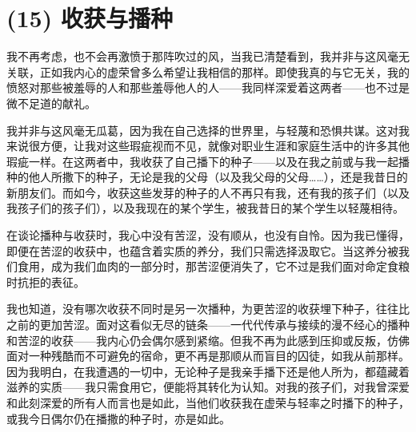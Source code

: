 \section{(15) 收获与播种}

我不再考虑，也不会再激愤于那阵吹过的风，当我已清楚看到，我并非与这风毫无关联，正如我内心的虚荣曾多么希望让我相信的那样。即使我真的与它无关，我的愤怒对那些被羞辱的人和那些羞辱他人的人——我同样深爱着这两者——也不过是微不足道的献礼。

我并非与这风毫无瓜葛，因为我在自己选择的世界里，与轻蔑和恐惧共谋。这对我来说很方便，让我对这些瑕疵视而不见，就像对职业生涯和家庭生活中的许多其他瑕疵一样。在这两者中，我收获了自己播下的种子——以及在我之前或与我一起播种的他人所撒下的种子，无论是我的父母（以及我父母的父母……），还是我昔日的新朋友们。而如今，收获这些发芽的种子的人不再只有我，还有我的孩子们（以及我孩子们的孩子们），以及我现在的某个学生，被我昔日的某个学生以轻蔑相待。

在谈论播种与收获时，我心中没有苦涩，没有顺从，也没有自怜。因为我已懂得，即便在苦涩的收获中，也蕴含着实质的养分，我们只需选择汲取它。当这养分被我们食用，成为我们血肉的一部分时，那苦涩便消失了，它不过是我们面对命定食粮时抗拒的表征。

我也知道，没有哪次收获不同时是另一次播种，为更苦涩的收获埋下种子，往往比之前的更加苦涩。面对这看似无尽的链条——一代代传承与接续的漫不经心的播种和苦涩的收获——我内心仍会偶尔感到紧缩。但我不再为此感到压抑或反叛，仿佛面对一种残酷而不可避免的宿命，更不再是那顺从而盲目的囚徒，如我从前那样。因为我明白，在我遭遇的一切中，无论种子是我亲手播下还是他人所为，都蕴藏着滋养的实质——我只需食用它，便能将其转化为认知。对我的孩子们，对我曾深爱和此刻深爱的所有人而言也是如此，当他们收获我在虚荣与轻率之时播下的种子，或我今日偶尔仍在播撒的种子时，亦是如此。